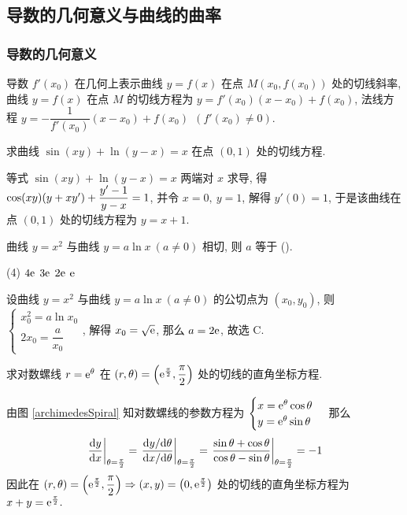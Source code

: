 \subsection{导数的几何意义与曲线的曲率}

\subsubsection{导数的几何意义}

导数 $f'(x_0)$ 在几何上表示曲线 $y=f(x)$ 在点 $M(x_0,f(x_0))$ 处的切线斜率, 曲线 $y=f(x)$ 在点 $M$ 的切线方程为 $y=f'(x_0)(x-x_0)+f(x_0)$, 法线方程 $y=-\dfrac{1}{f'(x_0)}(x-x_0)+f(x_0)~~(f'(x_0)\neq 0).$

\begin{example}[2008 数一]
    求曲线 $\sin(xy)+\ln(y-x)=x$ 在点 $(0,1)$ 处的切线方程.
\end{example}
\begin{solution}
    等式 $\sin(xy)+\ln(y-x)=x$ 两端对 $x$ 求导, 得 $\cos(xy)\qty(y+xy')+\dfrac{y'-1}{y-x}=1$, 并令 $x=0,~y=1$, 解得 $y'(0)=1$, 于是该曲线在点 $(0,1)$ 处的切线方程为 $y=x+1.$
\end{solution}

\begin{example}[2010 数二]
    曲线 $y=x^2$ 与曲线 $y=a\ln x~(a\neq 0)$ 相切, 则 $a$ 等于 (\quad).
    \begin{tasks}(4)
        \task $4\mathrm{e}$
        \task $3\mathrm{e}$
        \task $2\mathrm{e}$
        \task $\mathrm{e}$
    \end{tasks}
\end{example}
\begin{solution}
    设曲线 $y=x^2$ 与曲线 $y=a\ln x~(a\neq 0)$ 的公切点为 $(x_0,y_0)$, 则 $\begin{cases}
            x_0^2=a\ln x_0 \\2x_0=\dfrac{a}{x_0}
        \end{cases}$, 解得 $x_0=\sqrt{\mathrm{e}}$, 那么 $a=2\mathrm{e}$, 故选 C.
\end{solution}

\begin{example}
    求对数螺线 $r=\mathrm{e}^\theta$ 在 $(r,\theta)=\qty(\mathrm{e} ^{\frac{\pi}{2}},\dfrac{\pi}{2})$ 处的切线的直角坐标方程.
\end{example}
\begin{solution}
    由图 \ref{archimedesSpiral} 知对数螺线的参数方程为 $\begin{cases}
        x=\mathrm{e}^\theta\cos\theta\\y=\mathrm{e}^\theta\sin\theta
    \end{cases}$ 那么 
    $$\eval{\dv{y}{x}}_{\theta=\frac{\pi}{2}}=\eval{\dfrac{\dd y/\dd \theta}{\dd x/\dd \theta}}_{\theta=\frac{\pi}{2}}=\eval{\dfrac{\sin\theta+\cos\theta}{\cos\theta-\sin\theta}}_{\theta=\frac{\pi}{2}}=-1$$
    因此在 $(r,\theta)=\qty(\mathrm{e} ^{\frac{\pi}{2}},\dfrac{\pi}{2})\Rightarrow (x,y)=\qty(0,\mathrm{e} ^{\frac{\pi}{2}})$ 处的切线的直角坐标方程为 $x+y=\mathrm{e} ^{\frac{\pi}{2}}.$
\end{solution}

